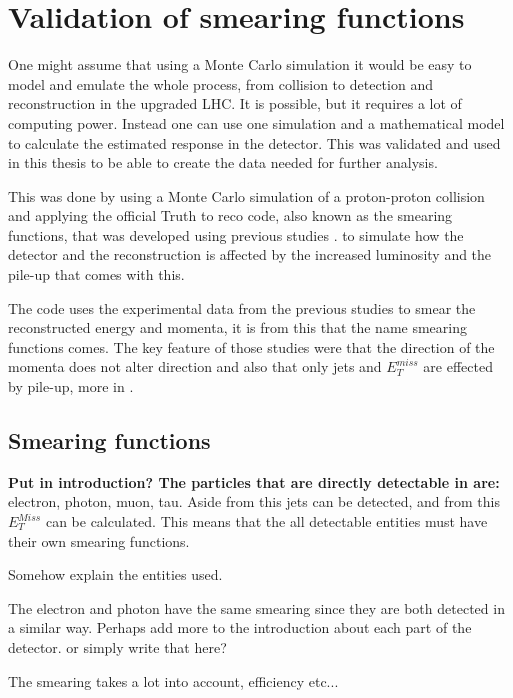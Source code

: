 \chapter{Validation of smearing functions}\label{cha:vali}
One might assume that using a Monte Carlo simulation it would be easy to model and emulate the whole process, from collision to detection and reconstruction in the upgraded LHC. It is possible, but it requires a lot of computing power. Instead one can use one simulation and a mathematical model to calculate the estimated response in the detector. This was validated and used in this thesis to be able to create the data needed for further analysis. 

This was done by using a Monte Carlo simulation of a proton-proton collision and applying the official Truth to reco code, also known as the smearing functions, that was developed using previous studies \citep{ATLAS:LOI2, ATL-PHYS-PUB-2013-004}. to simulate how the detector and the reconstruction is affected by the increased luminosity and the pile-up that comes with this.

The code uses the experimental data from the previous studies to smear the reconstructed energy and momenta, it is from this that the name smearing functions comes.
The key feature of those studies were that the direction of the momenta does not alter direction and also that only jets and $E^{miss}_T$ are effected by pile-up, more in .

\newpage
\section{Smearing functions}\label{sec:smear}
\textbf{Put in introduction? The particles that are directly detectable in \abbrATLAS are:} electron, photon, muon, tau. Aside from this jets can be detected, and from this $E_T^{Miss}$ can be calculated. This means that the all detectable entities must have their own smearing functions.

Somehow explain the entities used.

The electron and photon have the same smearing since they are both detected in a similar way.  Perhaps add more to the introduction about each part of the detector. or simply write that here?

The smearing takes a lot into account, efficiency etc...

